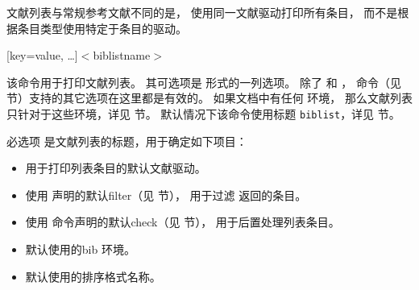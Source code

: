 文献列表与常规参考文献不同的是，
使用同一文献驱动打印所有条目，
而不是根据条目类型使用特定于条目的驱动。

\begin{ltxsyntax}

[key=value, \dots]{$<$biblistname$>$}


该命令用于打印文献列表。
其可选项是 \keyval 形式的一列选项。
除了  和 ，
 命令（见  节）支持的其它选项在这里都是有效的。
如果文档中有任何  环境，
那么文献列表只针对于这些环境，详见  节。
默认情况下该命令使用标题 \texttt{biblist}，详见  节。

必选项  是文献列表的标题，用于确定如下项目：
\begin{itemize}
\item %
用于打印列表条目的默认文献驱动。
\item %
使用  声明的默认filter（见  节），
用于过滤 \biber 返回的条目。
\item %
使用  命令声明的默认check（见  节），
用于后置处理列表条目。
\item %
默认使用的bib 环境。
\item %
默认使用的排序格式名称。
\end{itemize}




\end{ltxsyntax}
